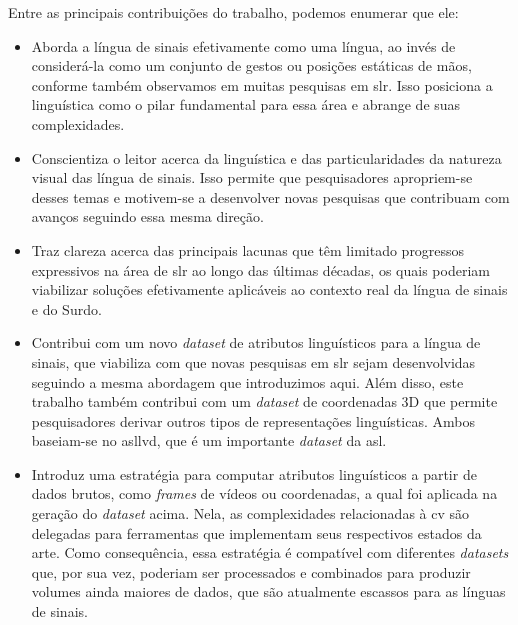 
Entre as principais contribuições do trabalho, podemos enumerar que ele:

\begin{itemize}
      \item Aborda a língua de sinais efetivamente como uma língua, ao invés de considerá-la como um conjunto de gestos ou posições estáticas de mãos, conforme também observamos em muitas pesquisas em \acrshort{slr}.
            Isso posiciona a linguística como o pilar fundamental para essa área e abrange de suas complexidades.

      \item Conscientiza o leitor acerca da linguística e das particularidades da natureza visual das língua de sinais.
            Isso permite que pesquisadores apropriem-se desses temas e motivem-se a desenvolver novas pesquisas que contribuam com avanços seguindo essa mesma direção.

      \item Traz clareza acerca das principais lacunas que têm limitado progressos expressivos na área de \acrshort{slr} ao longo das últimas décadas, os quais poderiam viabilizar soluções efetivamente aplicáveis ao contexto real da língua de sinais e do Surdo.

      \item Contribui com um novo \textit{dataset} de atributos linguísticos para a língua de sinais, que viabiliza com que novas pesquisas em \acrshort{slr} sejam desenvolvidas seguindo a mesma abordagem que introduzimos aqui.
            Além disso, este trabalho também contribui com um \textit{dataset} de coordenadas 3D que permite pesquisadores derivar outros tipos de representações linguísticas.
            Ambos baseiam-se no \acrshort{asllvd}, que é um importante \textit{dataset} da \acrshort{asl}.

      \item Introduz uma estratégia para computar atributos linguísticos a partir de dados brutos, como \textit{frames} de vídeos ou coordenadas, a qual foi aplicada na geração do \textit{dataset} acima.
            Nela, as complexidades relacionadas à \acrlong{cv} são delegadas para ferramentas que implementam seus respectivos estados da arte.
            Como consequência, essa estratégia é compatível com diferentes \textit{datasets} que, por sua vez, poderiam ser processados e combinados para produzir volumes ainda maiores de dados, que são atualmente escassos para as línguas de sinais.


\end{itemize}
